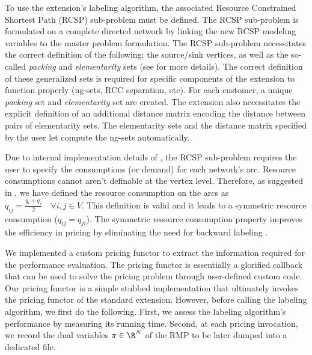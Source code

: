 To use the \vrpsolver{} extension's labeling algorithm,
the associated Resource Constrained Shortest Path (RCSP) sub-problem must be defined.
The RCSP sub-problem is formulated on a complete directed network by
linking the new RCSP modeling variables to the master problem formulation.
The RCSP sub-problem necessitates the correct definition of the following:
the source/sink vertices, as well as the so-called \textit{packing} and \textit{elementarity} sets
(see \cite{pessoa2020generic} for more details).
The correct definition of these generalized sets is required
for specific components  of the \vrpsolver{} extension to function properly (ng-sets, RCC separation, etc).
For each customer, a unique \textit{packing} set and \textit{elementarity} set are created.
The \vrpsolver{} extension also necessitates the explicit definition of an additional
distance matrix encoding the distance between pairs of elementarity sets.
The elementarity sets and the distance matrix specified by the user
let \bapcod{} compute the ng-sets automatically.

Due to internal implementation details of \bapcod{},
the RCSP sub-problem requires the user to specify the consumptions (or demand) for each network's arc.
Resource consumptions cannot aren't definable at the vertex level.
Therefore, as suggested in \textcite{pessoa2020generic}, we have defined the resource consumption
on the arcs as $q_{ij} = \frac{q_{i} + q_{j}}{2} \quad \forall i, j \in V$.
This definition is valid and it leads to a symmetric resource consumption ($q_{ij} = q_{ji}$).
The symmetric resource consumption property improves the efficiency in pricing
by eliminating the need for backward labeling \parencite{pessoa2020generic}.

We implemented a custom pricing functor to extract the information
required for the performance evaluation.
The pricing functor is essentially a glorified callback
that can be used to solve the pricing problem through user-defined custom code.
Our pricing functor is a simple stubbed implementation
that ultimately invokes the pricing functor of  the standard \vrpsolver{} extension.
However, before calling the labeling algorithm, we first do the following.
First, we assess the labeling algorithm's performance by measuring its running time.
Second, at each pricing invocation, we record the dual variables $\pi \in \R^N$ of the RMP
to be later dumped into a dedicated file.

